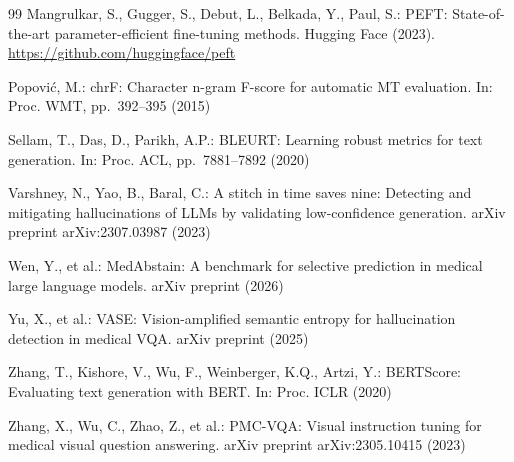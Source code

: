 \documentclass[pdflatex,sn-mathphys-num]{sn-jnl}
\begin{document}
\begin{thebibliography}{99}
Mangrulkar, S., Gugger, S., Debut, L., Belkada, Y., Paul, S.: PEFT: State-of-the-art parameter-efficient fine-tuning methods. Hugging Face (2023). \url{https://github.com/huggingface/peft}

Popovi{\'c}, M.: chrF: Character n-gram F-score for automatic MT evaluation. In: Proc. WMT, pp.~392--395 (2015)

Sellam, T., Das, D., Parikh, A.P.: BLEURT: Learning robust metrics for text generation. In: Proc. ACL, pp.~7881--7892 (2020)

Varshney, N., Yao, B., Baral, C.: A stitch in time saves nine: Detecting and mitigating hallucinations of LLMs by validating low-confidence generation. arXiv preprint arXiv:2307.03987 (2023)

Wen, Y., et al.: MedAbstain: A benchmark for selective prediction in medical large language models. arXiv preprint (2026)

Yu, X., et al.: VASE: Vision-amplified semantic entropy for hallucination detection in medical VQA. arXiv preprint (2025)

Zhang, T., Kishore, V., Wu, F., Weinberger, K.Q., Artzi, Y.: BERTScore: Evaluating text generation with BERT. In: Proc. ICLR (2020)

Zhang, X., Wu, C., Zhao, Z., et al.: PMC-VQA: Visual instruction tuning for medical visual question answering. arXiv preprint arXiv:2305.10415 (2023)

\end{thebibliography}
\end{document}

